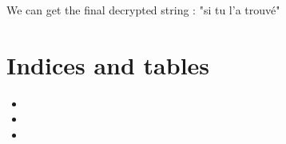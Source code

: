 \documentclass[letterpaper,10pt,english]{sphinxmanual}
\begin{document}
\begin{center}
  We can get the final decrypted string : "si tu l'a trouvé"
\end{center}




\chapter{Indices and tables}
\label{\detokenize{index:indices-and-tables}}\begin{itemize}
\item {} 
\sphinxAtStartPar
{}

\item {} 
\sphinxAtStartPar
{}

\item {} 
\sphinxAtStartPar
{}

\end{itemize}



\renewcommand{\indexname}{Index}
\printindex
\end{document}
